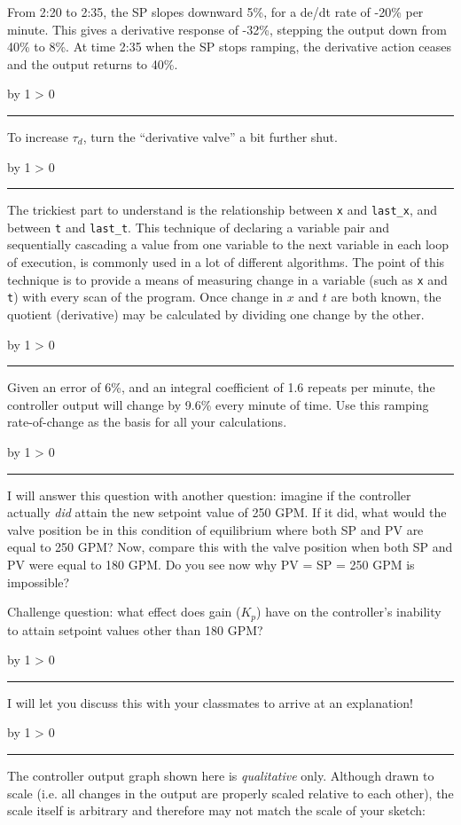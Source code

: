 \documentclass[12pt,a4paper]{article}
\def\svar{
           \advance\answnum by 1
           \ifnum \answnum > 0
                \hrule
                \vskip 3pt
                \leftline{Svar \the\answnum}
                \vskip 3pt \fi}
\begin{document}
From 2:20 to 2:35, the SP slopes downward 5\%, for a de/dt rate of -20\% per minute.  This gives a derivative response of -32\%, stepping the output down from 40\% to 8\%.  At time 2:35 when the SP stops ramping, the derivative action ceases and the output returns to 40\%.

\vskip 10pt \filbreak 
\svar{} 

To increase $\tau_d$, turn the ``derivative valve'' a bit further shut.

\vskip 10pt \filbreak 
\svar{} 

The trickiest part to understand is the relationship between {\tt x} and {\tt last\_x}, and between {\tt t} and {\tt last\_t}.  This technique of declaring a variable pair and sequentially cascading a value from one variable to the next variable in each loop of execution, is commonly used in a lot of different algorithms.  The point of this technique is to provide a means of measuring change in a variable (such as {\tt x} and {\tt t}) with every scan of the program.  Once change in $x$ and $t$ are both known, the quotient (derivative) may be calculated by dividing one change by the other.

\vskip 10pt \filbreak 
\svar{} 

Given an error of 6\%, and an integral coefficient of 1.6 repeats per minute, the controller output will change by 9.6\% every minute of time.  Use this ramping rate-of-change as the basis for all your calculations.

\vskip 10pt \filbreak 
\svar{} 

I will answer this question with another question: imagine if the controller actually {\it did} attain the new setpoint value of 250 GPM.  If it did, what would the valve position be in this condition of equilibrium where both SP and PV are equal to 250 GPM?  Now, compare this with the valve position when both SP and PV were equal to 180 GPM.  Do you see now why PV = SP = 250 GPM is impossible?

\vskip 10pt

Challenge question: what effect does gain ($K_p$) have on the controller's inability to attain setpoint values other than 180 GPM?

\vskip 10pt \filbreak 
\svar{} 

I will let you discuss this with your classmates to arrive at an explanation!

\vskip 10pt \filbreak 
\svar{} 

The controller output graph shown here is {\it qualitative} only.  Although drawn to scale (i.e. all changes in the output are properly scaled relative to each other), the scale itself is arbitrary and therefore may not match the scale of your sketch:
\end{document}
